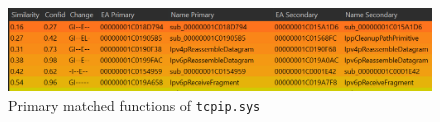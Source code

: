 \documentclass{report}
\begin{document}
\begin{figure}[H]
	\centering
    \includegraphics[width=\textwidth]{tcpipsys-bindiff-primary-matched.png}
    \caption{Primary matched functions of \texttt{tcpip.sys}}
    \label{fig:tcpipsys-bindiff-primary-matched}
\end{figure}
\end{document}
